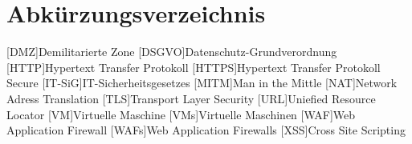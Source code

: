 \tableofcontents
\pagebreak

\section{Abkürzungsverzeichnis}

\begin{acronym}
    [DMZ]{Demilitarierte Zone}
    [DSGVO]{Datenschutz-Grundverordnung}
    [HTTP]{Hypertext Transfer Protokoll}
    [HTTPS]{Hypertext Transfer Protokoll Secure}
    [IT-SiG]{IT-Sicherheitsgesetzes}
    [MITM]{Man in the Mittle}
    [NAT]{Network Adress Translation}
    [TLS]{Transport Layer Security}
    [URL]{Uniefied Resource Locator}
    [VM]{Virtuelle Maschine}
    [VMs]{Virtuelle Maschinen}
    [WAF]{Web Application Firewall}
    [WAFs]{Web Application Firewalls}
    [XSS]{Cross Site Scripting}
\end{acronym}

\pagebreak

\listoffigures

\pagebreak